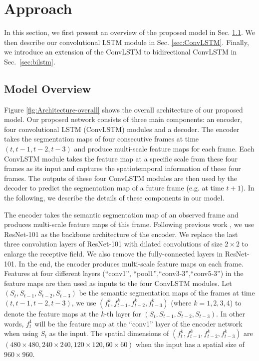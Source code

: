 \documentclass{bmvc2k}
\begin{document}
\section{Approach}\label{sec:approach}
In this section, we first present an overview of the proposed model in Sec. \ref{sec:overview}. We then describe our convolutional LSTM module in Sec. \ref{sec:ConvLSTM}. Finally, we introduce an extension of the ConvLSTM to bidirectional ConvLSTM in Sec.~\ref{sec:bilstm}.

\subsection{Model Overview}\label{sec:overview}
Figure \ref{fig:Architecture-overall} shows the overall architecture of our proposed model. Our proposed network consists of three main components: an encoder, four convolutional LSTM (ConvLSTM) modules and a decoder. The encoder takes the segmentation maps of four consecutive frames at time $(t, t-1, t-2, t-3)$ and produce multi-scale feature maps for each frame. Each ConvLSTM module takes the feature map at a specific scale from these four frames as its input and captures the spatiotemporal information of these four frames. The outputs of these four ConvLSTM modules are then used by the decoder to predict the segmentation map of a future frame (e.g. at time $t+1$). In the following, we describe the details of these components in our model.

The encoder takes the semantic segmentation map of an observed frame and produces multi-scale feature maps of this frame. Following previous work \cite{jin2017predicting}, we use ResNet-101 \cite{he2016deep} as the backbone architecture of the encoder. We replace the last three convolution layers of ResNet-101 with dilated convolutions of size $2\times 2$ to enlarge the receptive field. We also remove the fully-connected layers in ResNet-101. In the end, the encoder produces multi-scale feature maps on each frame. Features at four different layers (``conv1'', ``pool1'',``conv3-3'',``conv5-3'') in the feature maps are then used as inputs to the four ConvLSTM modules. Let $(S_{t},S_{t-1},S_{t-2}, S_{t-3})$ be the semantic segmentation maps of the frames at time $(t, t-1, t-2, t-3)$, we use $(f_{t}^k, f_{t-1}^k, f_{t-2}^k, f_{t-3}^k)$ (where $k=1,2,3,4$) to denote the feature maps at the $k$-th layer for $(S_{t}, S_{t-1}, S_{t-2}, S_{t-3})$. In other words, $f_{t}^1$ will be the feature map at the ``conv1'' layer of the encoder network when using $S_{t}$ as the input. The spatial dimensions of $(f_{t}^k, f_{t-1}^k, f_{t-2}^k, f_{t-3}^k)$ are $(480\times480, 240\times240, 120\times120, 60\times60)$ when the input has a spatial size of $960\times 960$.
\end{document}
